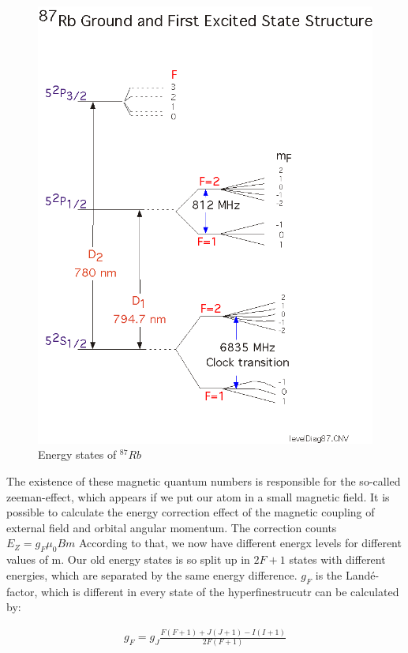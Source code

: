 \begin{figure}[htbp] 
     \includegraphics[scale=0.7]{level87.png}
  \caption{Energy states of $^{87}Rb$}
  \label{states}
\end{figure}

The existence of these magnetic quantum numbers is responsible for the so-called zeeman-effect, which appears if we put our atom in a small magnetic field. It is possible to calculate the energy correction effect of the magnetic coupling of external field and orbital angular momentum. The correction counts $E_Z=g_F\mu_0 Bm$
According to that, we now have different energx levels for different values of m. Our old energy states is so split up in $2F+1$ states with different energies, which are separated by the same energy difference. $g_F$ is the Landé-factor, which is different in every state of the hyperfinestrucutr can be calculated by:

\begin{align}
g_F=g_J \frac{F\left(F+1\right)+J\left(J+1\right)-I\left(I+1\right)}{2F\left(F+1\right)}
\end{align}

